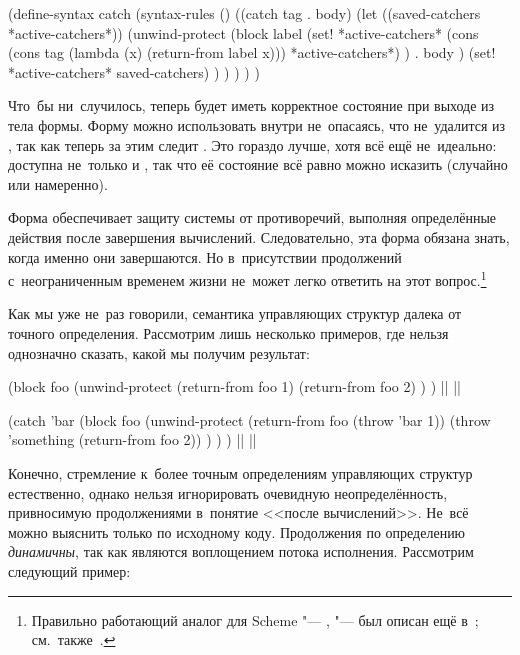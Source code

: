 \begin{code:lisp}
(define-syntax catch
  (syntax-rules ()
    ((catch tag . body)
     (let ((saved-catchers *active-catchers*))
       (unwind-protect
         (block label
           (set! *active-catchers*
                 (cons (cons tag (lambda (x) (return-from label x)))
                       *active-catchers*) )
           . body )
         (set! *active-catchers* saved-catchers) ) ) ) ) )
\end{code:lisp}

Что~бы ни~случилось, теперь  будет иметь корректное
состояние при выходе из тела формы. Форму  можно использовать внутри
 не~опасаясь, что  не~удалится из ,
так как теперь за этим следит . Это гораздо лучше, хотя всё
ещё не~идеально:  доступна не~только  и
, так что её состояние всё равно можно исказить (случайно или
намеренно).

Форма  обеспечивает защиту системы от противоречий, выполняя
определённые действия после завершения вычислений. Следовательно, эта форма
обязана знать, когда именно они завершаются. Но в~присутствии продолжений
с~неограниченным временем жизни  не~может легко ответить на
этот вопрос.\footnote*{Правильно работающий аналог  для
Scheme "--- , "--- был описан ещё в~\cite{fwh92};
см.~также~\cite{que93c}.}

Как мы уже не~раз говорили, семантика управляющих структур далека от точного
определения. Рассмотрим лишь несколько примеров, где нельзя однозначно сказать,
какой мы получим результат:

\begin{code:lisp}
(block foo
  (unwind-protect (return-from foo 1)
    (return-from foo 2) ) )                          |\is| ||

(catch 'bar
  (block foo
    (unwind-protect (return-from foo (throw 'bar 1))
      (throw 'something (return-from foo 2)) ) ) )   |\is| ||
\end{code:lisp}

Конечно, стремление к~более точным определениям управляющих структур
естественно, однако нельзя игнорировать очевидную неопределённость, привносимую
продолжениями в~понятие <<после вычислений>>. Не~всё можно выяснить только по
исходному коду. Продолжения по определению \emph{динамичны}, так как являются
воплощением потока исполнения. Рассмотрим следующий пример:

